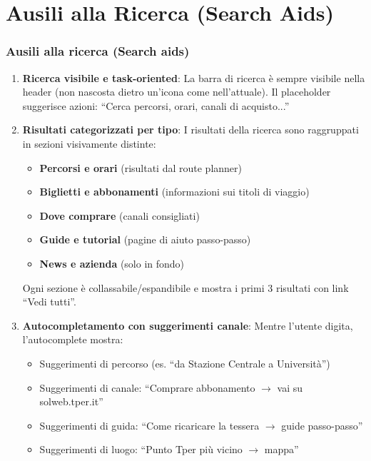 \section{Ausili alla Ricerca (Search Aids)}

\begin{tcolorbox}[colback=backgroundColor,colframe=borderColor,arc=2mm]
{\small

\subsubsection{Ausili alla ricerca (Search aids)}

\begin{enumerate}[leftmargin=*]

 \item \textbf{Ricerca visibile e task-oriented}: La barra di ricerca è sempre visibile nella header (non nascosta dietro un'icona come nell'attuale). Il placeholder suggerisce azioni: ``Cerca percorsi, orari, canali di acquisto...''

 \item \textbf{Risultati categorizzati per tipo}: I risultati della ricerca sono raggruppati in sezioni visivamente distinte:
 \begin{itemize}
   \item \textbf{Percorsi e orari} (risultati dal route planner)
   \item \textbf{Biglietti e abbonamenti} (informazioni sui titoli di viaggio)
   \item \textbf{Dove comprare} (canali consigliati)
   \item \textbf{Guide e tutorial} (pagine di aiuto passo-passo)
   \item \textbf{News e azienda} (solo in fondo)
 \end{itemize}
 Ogni sezione è collassabile/espandibile e mostra i primi 3 risultati con link ``Vedi tutti''.

 \item \textbf{Autocompletamento con suggerimenti canale}: Mentre l'utente digita, l'autocomplete mostra:
 \begin{itemize}
   \item Suggerimenti di percorso (es. ``da Stazione Centrale a Università'')
   \item Suggerimenti di canale: ``Comprare abbonamento $\rightarrow$ vai su solweb.tper.it''
   \item Suggerimenti di guida: ``Come ricaricare la tessera $\rightarrow$ guide passo-passo''
   \item Suggerimenti di luogo: ``Punto Tper più vicino $\rightarrow$ mappa''
 \end{itemize}


\end{enumerate}}
\end{tcolorbox}
